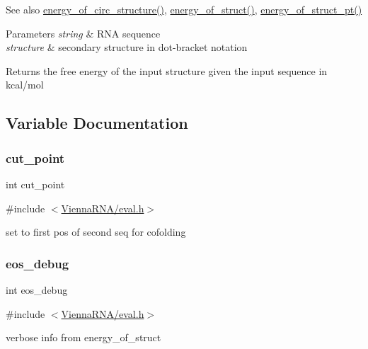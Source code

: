 \begin{DoxySeeAlso}{See also}
\mbox{\hyperlink{group__eval_gaeb14f3664aec67fc03268ac75253f0f8}{energy\+\_\+of\+\_\+circ\+\_\+structure()}}, \mbox{\hyperlink{group__eval_gac2b37fea2145c94d925a3f33378ef87b}{energy\+\_\+of\+\_\+struct()}}, \mbox{\hyperlink{group__eval_ga27ce6f68512d43bf1fe14a06c9d76d5c}{energy\+\_\+of\+\_\+struct\+\_\+pt()}} 
\end{DoxySeeAlso}

\begin{DoxyParams}{Parameters}
{\em string} & R\+NA sequence \\
\hline
{\em structure} & secondary structure in dot-\/bracket notation \\
\hline
\end{DoxyParams}
\begin{DoxyReturn}{Returns}
the free energy of the input structure given the input sequence in kcal/mol 
\end{DoxyReturn}


\subsection{Variable Documentation}
\mbox{\label{group__eval_gab9b2c3a37a5516614c06d0ab54b97cda}} 
\subsubsection{\texorpdfstring{cut\+\_\+point}{cut\_point}}
{\footnotesize\ttfamily int cut\+\_\+point}



{\ttfamily \#include $<$\mbox{\hyperlink{eval_8h}{Vienna\+R\+N\+A/eval.\+h}}$>$}



set to first pos of second seq for cofolding 

\mbox{\label{group__eval_ga567530678f6260a1a649a5beca5da4c5}} 
\subsubsection{\texorpdfstring{eos\+\_\+debug}{eos\_debug}}
{\footnotesize\ttfamily int eos\+\_\+debug}



{\ttfamily \#include $<$\mbox{\hyperlink{eval_8h}{Vienna\+R\+N\+A/eval.\+h}}$>$}



verbose info from energy\+\_\+of\+\_\+struct 


